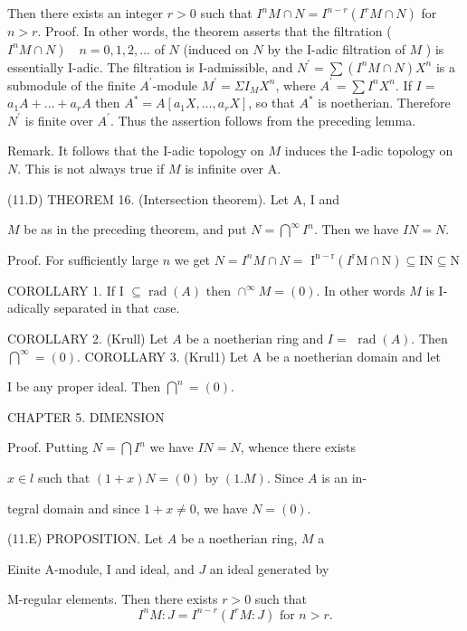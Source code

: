 Then there exists an integer $r>0$ such that $I^{n} M \cap N=I^{n-r}\left(I^{r} M \cap N\right)$ for $n>r$. Proof. In other words, the theorem asserts that the filtration ( $\left.I^{n} M \cap N\right) \quad n=0,1,2, \ldots$ of $N$ (induced on $N$ by the I-adic filtration of $M$ ) is essentially I-adic. The filtration is I-admissible, and $N^{\prime}=\sum\left(I^{n} M \cap N\right) X^{n}$ is a submodule of the finite $A^{\prime}$-module $M^{\prime}=\Sigma I_{M} X^{n}$, where $A^{\prime}=\sum I^{n} X^{n}$. If $I=$ $a_{1} A+\ldots+a_{r} A$ then $A^{*}=A\left[a_{1} X, \ldots, a_{r} X\right]$, so that $A^{*}$ is noetherian. Therefore $N^{\prime}$ is finite over $A^{\prime}$. Thus the assertion follows from the preceding lemma.

Remark. It follows that the I-adic topology on $M$ induces the I-adic topology on $N$. This is not always true if $M$ is infinite over A.

(11.D) THEOREM 16. (Intersection theorem). Let A, I and

$M$ be as in the preceding theorem, and put $N=\bigcap^{\infty} I^{n}$. Then we have $I N=N$.

Proof. For sufficiently large $n$ we get $N=I^{n} M \cap N=$ $\mathrm{I}^{\mathrm{n}-\mathrm{r}}\left(I^{\mathrm{r}} \mathrm{M} \cap \mathrm{N}\right) \subseteq \mathrm{IN} \subseteq \mathrm{N}$

COROLLARY 1. If I $\subseteq \operatorname{rad}(A)$ then $\cap^{\infty} M=(0)$. In other words $M$ is I-adically separated in that case.

COROLLARY 2. (Krull) Let $A$ be a noetherian ring and $I=$ $\operatorname{rad}(A)$. Then $\bigcap^{\infty}=(0)$. COROLLARY 3. (Krul1) Let A be a noetherian domain and let

I be any proper ideal. Then $\bigcap^{n}=(0)$.

CHAPTER 5. DIMENSION

Proof. Putting $N=\bigcap I^{n}$ we have $I N=N$, whence there exists

$x \in l$ such that $(1+x) N=(0)$ by $(1 . M)$. Since $A$ is an in-

tegral domain and since $1+x \neq 0$, we have $N=(0)$.

(11.E) PROPOSITION. Let $A$ be a noetherian ring, $M$ a

Einite A-module, I and ideal, and $J$ an ideal generated by

M-regular elements. Then there exists $r>0$ such that
$$
I^{n} M: J=I^{n-r}\left(I^{r} M: J\right) \text { for } n>r .
$$

